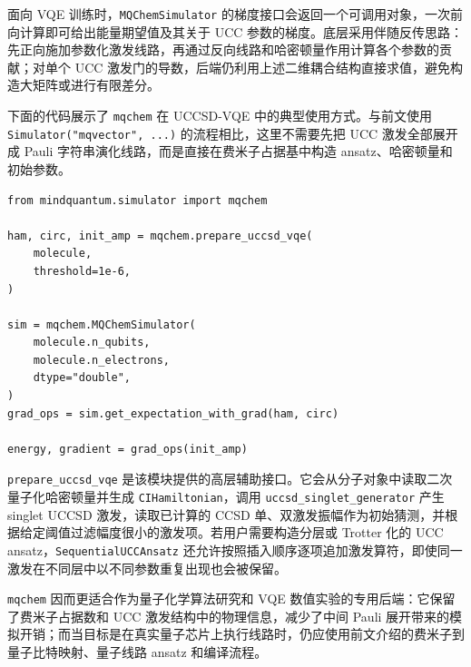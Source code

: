 面向 VQE 训练时，\texttt{MQChemSimulator} 的梯度接口会返回一个可调用对象，一次前向计算即可给出能量期望值及其关于 UCC 参数的梯度。底层采用伴随反传思路：先正向施加参数化激发线路，再通过反向线路和哈密顿量作用计算各个参数的贡献；对单个 UCC 激发门的导数，后端仍利用上述二维耦合结构直接求值，避免构造大矩阵或进行有限差分。

下面的代码展示了 \texttt{mqchem} 在 UCCSD-VQE 中的典型使用方式。与前文使用 \texttt{Simulator("mqvector", ...)} 的流程相比，这里不需要先把 UCC 激发全部展开成 Pauli 字符串演化线路，而是直接在费米子占据基中构造 ansatz、哈密顿量和初始参数。
\begin{lstlisting}
from mindquantum.simulator import mqchem

ham, circ, init_amp = mqchem.prepare_uccsd_vqe(
    molecule,
    threshold=1e-6,
)

sim = mqchem.MQChemSimulator(
    molecule.n_qubits,
    molecule.n_electrons,
    dtype="double",
)
grad_ops = sim.get_expectation_with_grad(ham, circ)

energy, gradient = grad_ops(init_amp)
\end{lstlisting}

\texttt{prepare\_uccsd\_vqe} 是该模块提供的高层辅助接口。它会从分子对象中读取二次量子化哈密顿量并生成 \texttt{CIHamiltonian}，调用 \texttt{uccsd\_singlet\_generator} 产生 singlet UCCSD 激发，读取已计算的 CCSD 单、双激发振幅作为初始猜测，并根据给定阈值过滤幅度很小的激发项。若用户需要构造分层或 Trotter 化的 UCC ansatz，\texttt{SequentialUCCAnsatz} 还允许按照插入顺序逐项追加激发算符，即使同一激发在不同层中以不同参数重复出现也会被保留。

\texttt{mqchem} 因而更适合作为量子化学算法研究和 VQE 数值实验的专用后端：它保留了费米子占据数和 UCC 激发结构中的物理信息，减少了中间 Pauli 展开带来的模拟开销；而当目标是在真实量子芯片上执行线路时，仍应使用前文介绍的费米子到量子比特映射、量子线路 ansatz 和编译流程。
